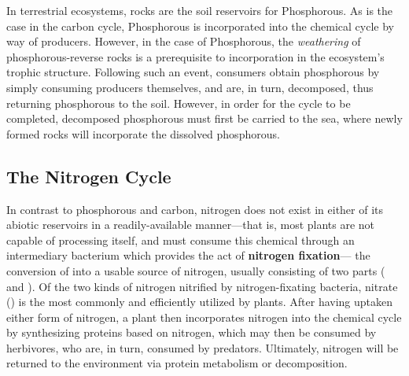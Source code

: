 \documentclass{article}
\begin{document}
In terrestrial ecosystems, rocks are the soil reservoirs for Phosphorous. As
is the case in the carbon cycle, Phosphorous is incorporated into the chemical
cycle by way of producers. However, in the case of Phosphorous, the
\emph{weathering} of phosphorous-reverse rocks is a prerequisite to incorporation
in the ecosystem's trophic structure. Following such an event, consumers obtain
phosphorous by simply consuming producers themselves, and are, in turn, decomposed,
thus returning phosphorous to the soil. However, in order for the cycle to be completed,
decomposed phosphorous must first be carried to the sea, where newly formed rocks
will incorporate the dissolved phosphorous.

\subsection{The Nitrogen Cycle}

In contrast to phosphorous and carbon, nitrogen does not exist in either of its
abiotic reservoirs in a readily-available manner---that is, most plants are not
capable of processing  itself, and must consume this chemical through
an intermediary bacterium which provides the act of \textbf{nitrogen fixation}---
the conversion of  into a usable source of nitrogen, usually consisting of
two parts ( and ). Of the two kinds of nitrogen nitrified by
nitrogen-fixating bacteria, nitrate () is the most commonly and efficiently
utilized by plants. After having uptaken either form of nitrogen, a plant then
incorporates nitrogen into the chemical cycle by synthesizing proteins based on
nitrogen, which may then be consumed by herbivores, who are, in turn, consumed by
predators. Ultimately, nitrogen will be returned to the environment via protein
metabolism or decomposition.
\end{document}
